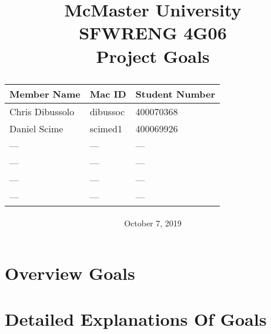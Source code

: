 \documentclass[12pt, titlepage]{article}
\title{
McMaster University\\
SFWRENG 4G06\\
\bigskip\bigskip\bigskip
{\bf Project Goals\\}
\bigskip\bigskip\bigskip\bigskip
\begin{table}[h!]
\begin{center}
\begin{tabular}{|p{5cm}|p{5cm}|p{5cm}|}
	\hline
	\bf Member Name & \bf Mac ID & \bf Student Number\\
	\hline
	\hline
	Chris Dibussolo & dibussoc & 400070368\\
	\hline
	Daniel Scime & scimed1 & 400069926\\
	\hline
  --- & --- & ---\\
	\hline
  --- & --- & ---\\
	\hline
  --- & --- & ---\\
	\hline
  --- & --- & ---\\
	\hline
\end{tabular}
\end{center}
\end{table}
\date{October 7, 2019}
}
\begin{document}
\maketitle

\newpage


\section{Overview Goals}


\section{Detailed Explanations Of Goals}

\end{document}
